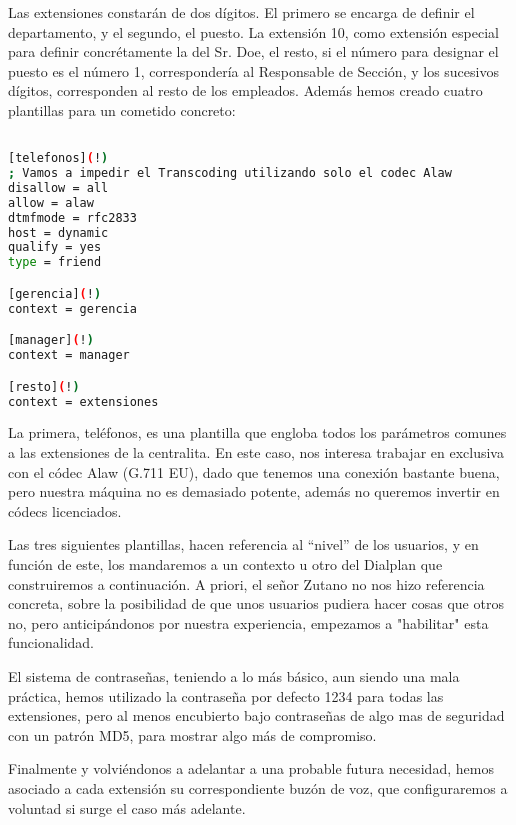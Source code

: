 
Las extensiones constarán de dos dígitos. El primero se encarga de definir el departamento, y el segundo, el puesto. La extensión 10, como extensión especial para definir concrétamente la del Sr. Doe, el resto, si el número para designar el puesto es el número 1, correspondería al Responsable de Sección, y los sucesivos dígitos, corresponden al resto de los empleados. Además hemos creado cuatro plantillas para un cometido concreto: 

\begin{lstlisting}[language=bash,title={/etc/asterisk/sip.conf}]

[telefonos](!)
; Vamos a impedir el Transcoding utilizando solo el codec Alaw
disallow = all
allow = alaw
dtmfmode = rfc2833
host = dynamic
qualify = yes
type = friend

[gerencia](!)
context = gerencia

[manager](!)
context = manager

[resto](!)
context = extensiones

\end{lstlisting}

La primera, teléfonos, es una plantilla que engloba todos los parámetros comunes a las extensiones de la centralita. En este caso, nos interesa trabajar en exclusiva con el códec Alaw (G.711 EU), dado que tenemos una conexión bastante buena, pero nuestra máquina no es demasiado potente, además no queremos invertir en códecs licenciados.

Las tres siguientes plantillas, hacen referencia al ``nivel'' de los usuarios, y en función de este, los mandaremos a un contexto u otro del Dialplan que construiremos a continuación. A priori, el señor Zutano no nos hizo referencia concreta, sobre la posibilidad de que unos usuarios pudiera hacer cosas que otros no, pero anticipándonos por nuestra experiencia, empezamos a "habilitar" esta funcionalidad.

El sistema de contraseñas, teniendo a lo más básico, aun siendo una mala práctica, hemos utilizado la contraseña por defecto 1234 para todas las extensiones, pero al menos encubierto bajo contraseñas de algo mas de seguridad con un patrón MD5, para mostrar algo más de compromiso.

Finalmente y volviéndonos a adelantar a una probable futura necesidad, hemos asociado a cada extensión su correspondiente buzón de voz, que configuraremos a voluntad si surge el caso más adelante.

